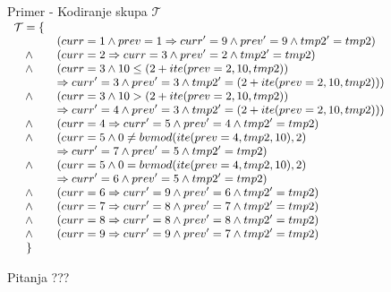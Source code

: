 \documentclass{beamer}
\begin{document}
\begin{frame}{Primer - Kodiranje skupa $\mathcal{T}$}
    $
    \displaystyle
    \small
    \begin{array}{cl}
    \mathcal{T} = \{ & \\
    & (curr = 1 \wedge prev = 1 \Rightarrow curr' = 9 \wedge prev' = 9 \wedge tmp2' = tmp2) \\
    \wedge & (curr = 2 \Rightarrow curr = 3 \wedge prev' = 2 \wedge tmp2' = tmp2) \\
    \wedge & (curr = 3 \wedge 10 \leq (2 + ite(prev = 2, 10, tmp2)) \\
    & \Rightarrow curr' = 3 \wedge prev' = 3 \wedge tmp2' = (2 + ite(prev = 2, 10, tmp2)))\\
    \wedge & (curr = 3 \wedge 10 > (2 + ite(prev = 2, 10, tmp2)) \\
    & \Rightarrow curr' = 4 \wedge prev' = 3 \wedge tmp2' = (2 + ite(prev = 2, 10, tmp2)))\\
    \wedge & (curr = 4 \Rightarrow curr' = 5 \wedge prev' = 4 \wedge tmp2' = tmp2) \\
    \wedge & (curr = 5 \wedge 0 \neq bvmod(ite(prev = 4, tmp2, 10), 2) \\
    & \Rightarrow curr' = 7 \wedge prev' = 5 \wedge tmp2' = tmp2)\\
    \wedge & (curr = 5 \wedge 0 = bvmod(ite(prev = 4, tmp2, 10), 2) \\
    & \Rightarrow curr' = 6 \wedge prev' = 5 \wedge tmp2' = tmp2)\\
    \wedge & (curr = 6 \Rightarrow curr' = 9 \wedge prev' = 6 \wedge tmp2' = tmp2) \\
    \wedge & (curr = 7 \Rightarrow curr' = 8 \wedge prev' = 7 \wedge tmp2' = tmp2) \\
    \wedge & (curr = 8 \Rightarrow curr' = 8 \wedge prev' = 8 \wedge tmp2' = tmp2) \\
    \wedge & (curr = 9 \Rightarrow curr' = 9 \wedge prev' = 7 \wedge tmp2' = tmp2) \\
    \} &
    \end{array}
    $
\end{frame}

\begin{frame}{Pitanja}
    \centering
    ???
\end{frame}
\end{document}
